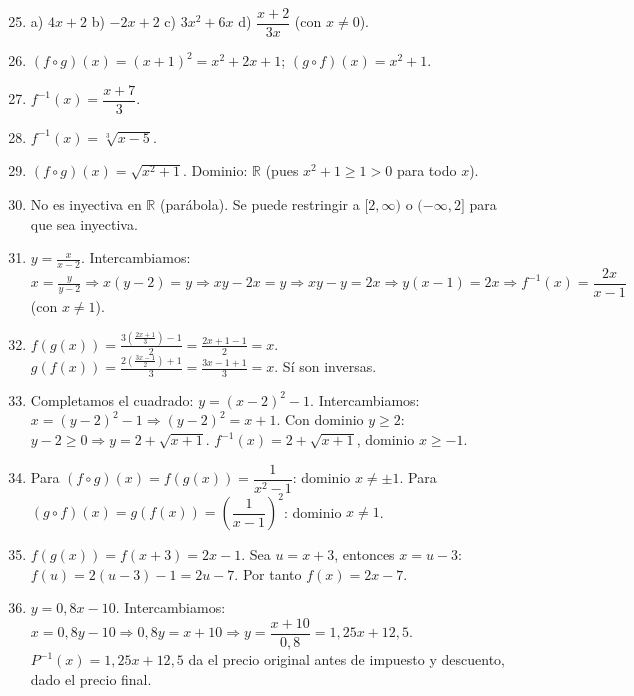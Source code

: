 \documentclass[12pt, a4paper]{article}
\begin{document}
\begin{enumerate}[leftmargin=*, label=\textbf{\arabic*.}]
  \setcounter{enumi}{24}
  \item a) $4x + 2$ \quad b) $-2x + 2$ \quad c) $3x^2 + 6x$ \quad d) $\dfrac{x + 2}{3x}$ (con $x \neq 0$).

  \item $(f \circ g)(x) = (x + 1)^2 = x^2 + 2x + 1$; \quad $(g \circ f)(x) = x^2 + 1$.

  \item $f^{-1}(x) = \dfrac{x + 7}{3}$.

  \item $f^{-1}(x) = \sqrt[3]{x - 5}$.

  \item $(f \circ g)(x) = \sqrt{x^2 + 1}$. Dominio: $\mathbb{R}$ (pues $x^2 + 1 \geq 1 > 0$ para todo $x$).

  \item No es inyectiva en $\mathbb{R}$ (parábola). Se puede restringir a $[2, \infty)$ o $(-\infty, 2]$ para que sea inyectiva.

  \item $y = \frac{x}{x - 2}$. Intercambiamos: $x = \frac{y}{y - 2} \Rightarrow x(y - 2) = y \Rightarrow xy - 2x = y \Rightarrow xy - y = 2x \Rightarrow y(x - 1) = 2x \Rightarrow f^{-1}(x) = \dfrac{2x}{x - 1}$ (con $x \neq 1$).

  \item $f(g(x)) = \frac{3\left(\frac{2x + 1}{3}\right) - 1}{2} = \frac{2x + 1 - 1}{2} = x$. $g(f(x)) = \frac{2\left(\frac{3x - 1}{2}\right) + 1}{3} = \frac{3x - 1 + 1}{3} = x$. Sí son inversas.

  \item Completamos el cuadrado: $y = (x - 2)^2 - 1$. Intercambiamos: $x = (y - 2)^2 - 1 \Rightarrow (y - 2)^2 = x + 1$. Con dominio $y \geq 2$: $y - 2 \geq 0 \Rightarrow y = 2 + \sqrt{x + 1}$. $f^{-1}(x) = 2 + \sqrt{x + 1}$, dominio $x \geq -1$.

  \item Para $(f \circ g)(x) = f(g(x)) = \dfrac{1}{x^2 - 1}$: dominio $x \neq \pm 1$. Para $(g \circ f)(x) = g(f(x)) = \left(\dfrac{1}{x - 1}\right)^2$: dominio $x \neq 1$.

  \item $f(g(x)) = f(x + 3) = 2x - 1$. Sea $u = x + 3$, entonces $x = u - 3$: $f(u) = 2(u - 3) - 1 = 2u - 7$. Por tanto $f(x) = 2x - 7$.

  \item $y = 0{,}8x - 10$. Intercambiamos: $x = 0{,}8y - 10 \Rightarrow 0{,}8y = x + 10 \Rightarrow y = \dfrac{x + 10}{0{,}8} = 1{,}25x + 12{,}5$. $P^{-1}(x) = 1{,}25x + 12{,}5$ da el precio original antes de impuesto y descuento, dado el precio final.
\end{enumerate}
\end{document}
